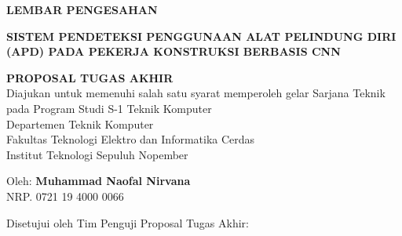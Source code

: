 
\begin{center}
  \large
  \textbf{LEMBAR PENGESAHAN}
\end{center}

\thispagestyle{empty}

\begin{center}
  \textbf{SISTEM PENDETEKSI PENGGUNAAN ALAT PELINDUNG DIRI (APD) PADA PEKERJA KONSTRUKSI BERBASIS CNN}
\end{center}

\begingroup
\small

\begin{center}
  \textbf{PROPOSAL TUGAS AKHIR} \\
  Diajukan untuk memenuhi salah satu syarat memperoleh gelar
  Sarjana Teknik pada
  Program Studi S-1 Teknik Komputer \\
  Departemen Teknik Komputer \\
  Fakultas Teknologi Elektro dan Informatika Cerdas \\
  Institut Teknologi Sepuluh Nopember
\end{center}

\begin{center}
  Oleh: \textbf{Muhammad Naofal Nirvana} \\
  NRP. 0721 19 4000 0066
\end{center}

\begin{center}
  Disetujui oleh Tim Penguji Proposal Tugas Akhir:
\end{center}

\begingroup
\setlength{\tabcolsep}{0pt}

